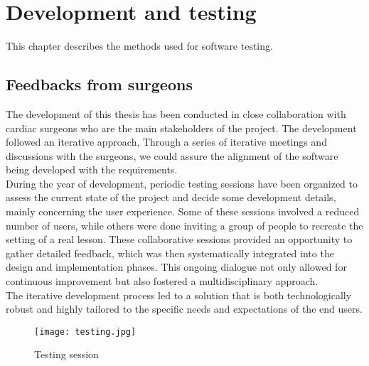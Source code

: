 \chapter{Development and testing}
\label{chp:testing}
\noindent
This chapter describes the methods used for software testing.

\section{Feedbacks from surgeons}
\noindent
The development of this thesis has been conducted in close collaboration with cardiac surgeons who are the main stakeholders of the project.
The development followed an iterative approach, Through a series of iterative meetings and discussions with the surgeons, we could assure the alignment of the software being developed with the requirements.\\
During the year of development, periodic testing sessions have been organized to assess the current state of the project and decide some development details, mainly concerning the user experience. Some of these sessions involved a reduced number of users, while others were done inviting a group of people to recreate the setting of a real lesson.
These collaborative sessions provided an opportunity to gather detailed feedback, which was then systematically integrated into the design and implementation phases.
This ongoing dialogue not only allowed for continuous improvement but also fostered a multidisciplinary approach.\\
The iterative development process led to a solution that is both technologically robust and highly tailored to the specific needs and expectations of the end users.\\


\begin{figure}[ht]
  \centering
  \texttt{[image: testing.jpg]}
  \caption{Testing session}
  \label{fig:testing}
\end{figure}

